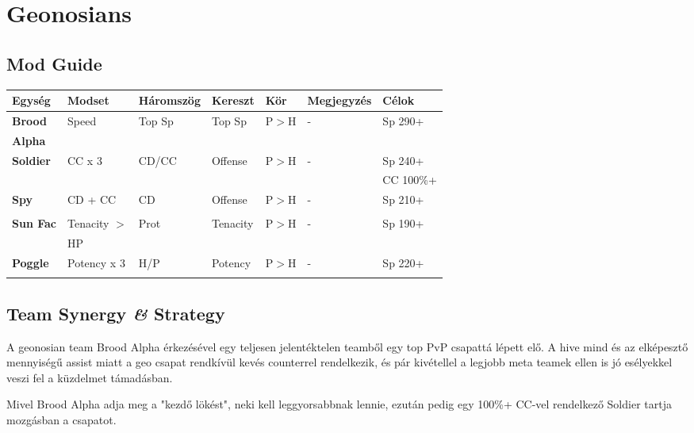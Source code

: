 \documentclass[11pt]{report}
\begin{document}
\chapter{Geonosians}
\section{Mod Guide}
\begin{center}
    \begin{tabular}{|l | l | l | l | l | l | l |}
        \hline
        Egység & Modset & Háromszög & Kereszt & Kör & Megjegyzés & Célok\\ \hline
        \textbf{Brood} & Speed & Top Sp & Top Sp & P$>$H & - & Sp 290+\\
        \textbf{Alpha} &  &  &  &  &  & \\ \hline
        \textbf{Soldier} & CC x 3 & CD/CC & Offense & P$>$H & - & Sp 240+\\
        &  &  &  &  &  & CC 100\%+\\ \hline
        \textbf{Spy} & CD + CC & CD & Offense & P$>$H & - & Sp 210+\\
        &  &  &  &  &  & \\ \hline
        \textbf{Sun Fac} & Tenacity $>$ & Prot & Tenacity & P$>$H & - & Sp 190+\\
        & HP &  &  &  &  & \\ \hline
        \textbf{Poggle} & Potency x 3 & H/P & Potency & P$>$H & - & Sp 220+\\
        &  &  &  &  &  & \\ \hline
    \end{tabular}
\end{center}
\section{Team Synergy \textit{\&} Strategy}
A geonosian team Brood Alpha érkezésével egy teljesen jelentéktelen teamből egy top PvP csapattá lépett elő. A hive mind és az elképesztő mennyiségű assist miatt a geo csapat rendkívül kevés counterrel rendelkezik, és pár kivétellel a legjobb meta teamek ellen is jó esélyekkel veszi fel a küzdelmet támadásban.\par
Mivel Brood Alpha adja meg a "kezdő lökést", neki kell leggyorsabbnak lennie, ezután pedig egy 100\%+ CC-vel rendelkező Soldier tartja mozgásban a csapatot.

\end{document}
